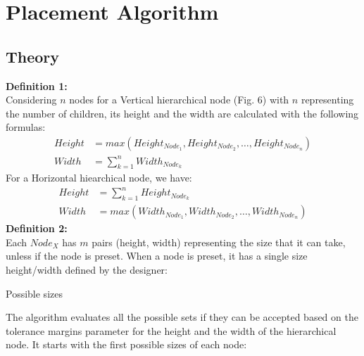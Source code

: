 \chapter{Placement Algorithm}
\section{Theory}
{\bf \noindent  Definition 1:} \\
Considering $n$ nodes for a Vertical hierarchical node (Fig. 6) with $n$ representing the number of children, its height and the width are calculated with the following formulas: \\
\vspace{-0.5cm}
\begin{subequations}
\begin{align}
Height &= max(Height_{Node_1}, Height_{Node_2}, \hdots, Height_{Node_n})\\
Width  &= \sum_{k=1}^{n} Width_{Node_k} 
\end{align}
\end{subequations}
For a Horizontal hiearchical node, we have:
\vspace{-0.25cm}
\begin{subequations}
\begin{align}
Height &= \sum_{k=1}^{n} Height_{Node_k} \\
Width  &=  max(Width_{Node_1}, Width_{Node_2}, \hdots, Width_{Node_n})
\end{align}
\end{subequations}
{\bf \noindent  Definition 2:} \\
Each $Node_X$ has $m$ pairs (height, width) representing the size that it can take, unless if the node is preset. When a node is preset, it has a single size height/width defined by the designer:

\begin{algorithm}
\caption{Possible sizes}
\end{algorithm}
The algorithm evaluates all the possible sets if they can be accepted based on the tolerance margins parameter for the height and the width of the hierarchical node. It starts with the first possible sizes of each node:

